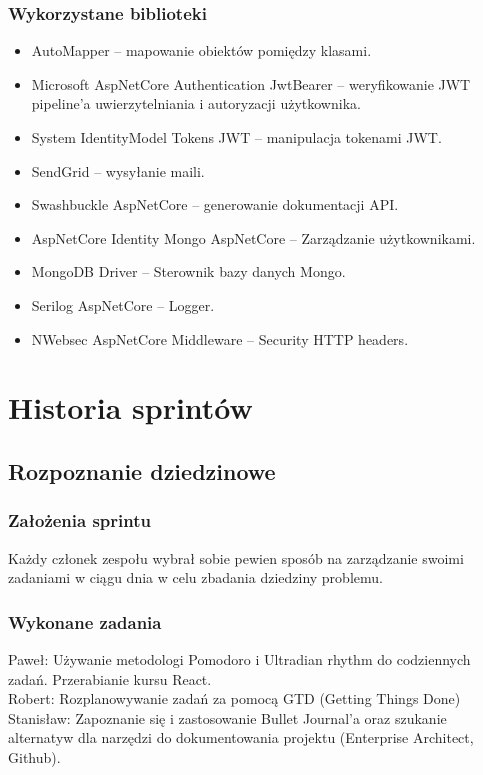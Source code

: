 \documentclass[a4paper,11pt]{report}
\begin{document}
\subsection{Wykorzystane biblioteki}
\begin{itemize}
	\item AutoMapper – mapowanie obiektów pomiędzy klasami.
	\item Microsoft AspNetCore Authentication JwtBearer – weryfikowanie JWT pipeline'a uwierzytelniania i autoryzacji użytkownika.
	\item System IdentityModel Tokens JWT – manipulacja tokenami JWT.
	\item SendGrid – wysyłanie maili.
	\item Swashbuckle AspNetCore – generowanie dokumentacji API.
	\item AspNetCore Identity Mongo AspNetCore – Zarządzanie użytkownikami.
	\item MongoDB Driver – Sterownik bazy danych Mongo.
	\item Serilog AspNetCore – Logger.
	\item NWebsec AspNetCore Middleware – Security HTTP headers.
\end{itemize}

\chapter {Historia sprintów}
\section {Rozpoznanie dziedzinowe}
\subsection {Założenia sprintu}
Każdy członek zespołu wybrał sobie pewien sposób na zarządzanie swoimi zadaniami w ciągu dnia w celu zbadania dziedziny problemu.
\subsection {Wykonane zadania}
Paweł: Używanie metodologi Pomodoro i Ultradian rhythm do codziennych zadań. Przerabianie kursu React.\\
Robert: Rozplanowywanie zadań za pomocą GTD (Getting Things Done)\\
Stanisław: Zapoznanie się i zastosowanie Bullet Journal'a oraz szukanie alternatyw dla narzędzi do dokumentowania projektu (Enterprise Architect, Github).\\
\end{document}
